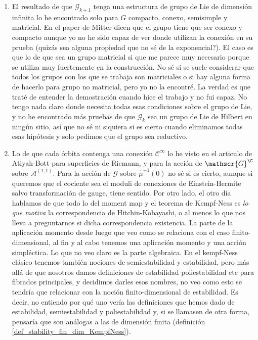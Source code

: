 {\begin{enumerate}
    \item[\textbf{(9)}] El resultado de que \(\mathscr{G}_{k+1}\) tenga una estructura de grupo de Lie de dimensión infinita lo he encontrado solo para \(G\) compacto, conexo, semisimple y matricial. En el paper de Mitter \parencite{mitter1981bundle} dicen que el grupo tiene que ser conexo y compacto aunque yo no he sido capaz de ver donde utilizan la conexión en su prueba (quizás sea alguna propiedad que no sé de la exponencial?). El caso es que lo de que sea un grupo matricial si que me parece muy necesario porque se utiliza muy fuertemente en la construcción. No sé si se suele considerar que todos los grupos con los que se trabaja son matriciales o si hay alguna forma de hacerlo para grupo no matricial, pero yo no la encontré. La verdad es que traté de entender la demostración cuando hice el trabajo y no fui capaz. No tengo nada claro donde necesita todas esas condiciones sobre el grupo de Lie, y no he encontrado más pruebas de que \(\mathscr{G}_k\) sea un grupo de Lie de Hilbert en ningún sitio, así que no sé ni siquiera si es cierto cuando eliminamos todas esas hipótesis y solo pedimos que el grupo sea reductivo.
    \item[\textbf{(10)}] Lo de que cada órbita contenga una conexión \(\mathscr{C}^\infty\) lo he visto en el articulo de Atiyah-Bott para superficies de Riemann, y para la acción de \(\mathscr{G}^\C\) sobre \(\mathscr{A}^{(1,1)}\). Para la acción de \(\mathscr{G}\) sobre \(\hat\mu^{-1}(0)\) no sé si es cierto, aunque si queremos que el cociente sea el moduli de conexiones de Einstein-Hermite salvo transformación de gauge, tiene sentido. Por otro lado, el otro día hablamos de que todo lo del moment map y el teorema de Kempf-Ness es \textit{lo que motiva} la correspondencia de Hitchin-Kobayashi, o al menos lo que nos lleva a preguntarnos si dicha correspondencia existencia. La parte de la aplicación momento desde luego que veo como se relaciona con el caso finito-dimensional, al fin y al cabo tenemos una aplicación momento y una acción simpléctica. Lo que no veo claro es la parte algebraica. En el kempf-Ness clásico tenemos también nociones de semiestabilidad y estabilidad, pero más allá de que nosotros damos definiciones de estabilidad poliestabilidad etc para fibrados principales, y decidimos darles esos nombres, no veo como esto se tendría que relacionar con la noción finito-dimensional de estabilidad. Es decir, no entiendo por qué uno vería las definiciones que hemos dado de estabilidad, semiestabilidad y poliestabilidad y, si se llamasen de otra forma, pensaría que son análogas a las de dimensión finita (definición \ref{def_stability_fin_dim_KempfNess}).

\end{enumerate}}
